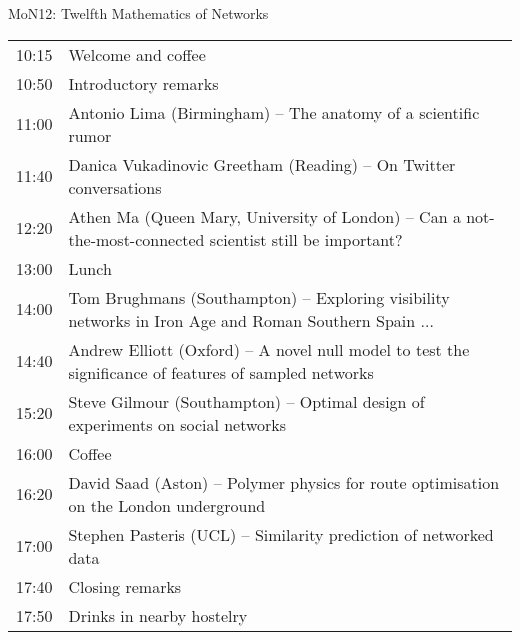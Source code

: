 \documentclass[10pt]{article}
\begin{document}
\begin{center}
\huge{MoN12: Twelfth Mathematics of Networks}
\end{center}

\vspace{0.5cm}

\begin{tabular}{| m{}  | m{}  |} \hline
10:15 &	Welcome and coffee \\
10:50 &	Introductory remarks \\
11:00 &	Antonio Lima (Birmingham) – The anatomy of a scientific rumor \\
11:40 &	Danica Vukadinovic Greetham (Reading) – On Twitter conversations  \\
12:20 &	Athen Ma (Queen Mary, University of London) – Can a not-the-most-connected scientist still be important? 	 \\
13:00 &	Lunch  \\
14:00 &	Tom Brughmans (Southampton) – Exploring visibility networks in Iron Age and Roman Southern Spain $\ldots$  \\
14:40 &	Andrew Elliott (Oxford) – A novel null model to test the significance of features of sampled networks 	 \\
15:20 &	Steve Gilmour (Southampton) – Optimal design of experiments on social networks 	 \\
16:00 &	Coffee  \\
16:20 &	David Saad (Aston) – Polymer physics for route optimisation on the London underground  \\
17:00 &	Stephen Pasteris (UCL) – Similarity prediction of networked data 	 \\
17:40 &	Closing remarks  \\
17:50 & Drinks in nearby hostelry   \\ \hline
\end{tabular}

\vspace{0.5cm}
\end{document}
